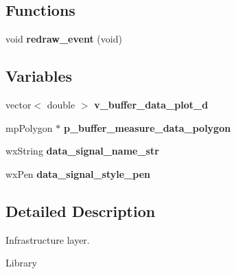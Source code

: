 \subsection*{Functions}
\begin{DoxyCompactItemize}
\item 
\mbox{\label{group___infrastructure_ga7bcc2222a3a6c1766b42c11949e573e4}} 
void {\bfseries redraw\+\_\+event} (void)
\end{DoxyCompactItemize}
\subsection*{Variables}
\begin{DoxyCompactItemize}
\item 
\mbox{\label{group___infrastructure_gae49108e5b3e55b3f8601095bee281211}} 
vector$<$ double $>$ {\bfseries v\+\_\+buffer\+\_\+data\+\_\+plot\+\_\+d}
\item 
\mbox{\label{group___infrastructure_ga1f17446680e66bcf2eab8352edd52345}} 
mp\+Polygon $\ast$ {\bfseries p\+\_\+buffer\+\_\+measure\+\_\+data\+\_\+polygon}
\item 
\mbox{\label{group___infrastructure_ga5113f9ac4b41965cfb443ebb272386bb}} 
wx\+String {\bfseries data\+\_\+signal\+\_\+name\+\_\+str}
\item 
\mbox{\label{group___infrastructure_gaaed1e1395c402f34a90f3891ee7f990d}} 
wx\+Pen {\bfseries data\+\_\+signal\+\_\+style\+\_\+pen}
\end{DoxyCompactItemize}


\subsection{Detailed Description}
Infrastructure layer. 

Library 